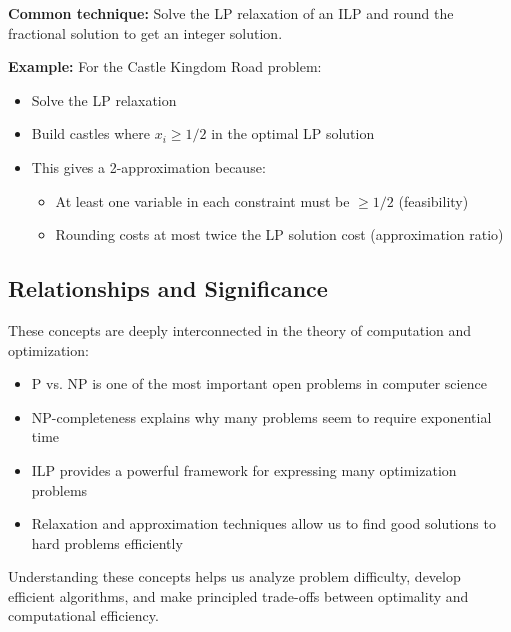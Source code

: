 \textbf{Common technique:} Solve the LP relaxation of an ILP and round the fractional solution to get an integer solution.

\textbf{Example:} For the Castle Kingdom Road problem:
\begin{itemize}
    \item Solve the LP relaxation
    \item Build castles where $x_i \geq 1/2$ in the optimal LP solution
    \item This gives a 2-approximation because:
    \begin{itemize}
        \item At least one variable in each constraint must be $\geq 1/2$ (feasibility)
        \item Rounding costs at most twice the LP solution cost (approximation ratio)
    \end{itemize}
\end{itemize}

\subsection{Relationships and Significance}
These concepts are deeply interconnected in the theory of computation and optimization:
\begin{itemize}
    \item P vs. NP is one of the most important open problems in computer science
    \item NP-completeness explains why many problems seem to require exponential time
    \item ILP provides a powerful framework for expressing many optimization problems
    \item Relaxation and approximation techniques allow us to find good solutions to hard problems efficiently
\end{itemize}

Understanding these concepts helps us analyze problem difficulty, develop efficient algorithms, and make principled trade-offs between optimality and computational efficiency.